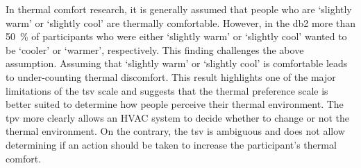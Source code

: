 In thermal comfort research, it is generally assumed that people who are `slightly warm' or `slightly cool' are thermally comfortable.
However, in the \ac{db2} more than \qty{50}{\percent} of participants who were either `slightly warm' or `slightly cool' wanted to be `cooler' or `warmer', respectively.
This finding challenges the above assumption. 
Assuming that `slightly warm' or `slightly cool' is comfortable leads to under-counting thermal discomfort.
This result highlights one of the major limitations of the \ac{tsv} scale and suggests that the thermal preference scale is better suited to determine how people perceive their thermal environment.
The \ac{tpv} more clearly allows an HVAC system to decide whether to change or not the thermal environment. 
On the contrary, the \ac{tsv} is ambiguous and does not allow determining if an action should be taken to increase the participant's thermal comfort.

